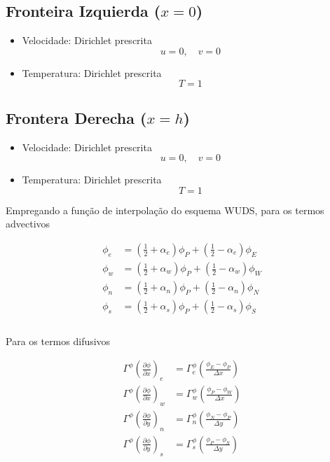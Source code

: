 \documentclass[]{article}
\begin{document}
\subsection*{Fronteira Izquierda (\(x = 0\))}
\begin{itemize}
	\item Velocidade: Dirichlet prescrita
	\[
	u = 0, \quad v = 0
	\]
	
	\item Temperatura: Dirichlet prescrita
	\[
	T = 1
	\]
	
\end{itemize}

\subsection*{Frontera Derecha (\(x = h\))}
\begin{itemize}
	\item Velocidade: Dirichlet prescrita 
	\[
	u = 0, \quad v = 0
	\]
	
	\item Temperatura: Dirichlet prescrita
	\[
	T = 1
	\]
	
\end{itemize}

Empregando a função de interpolação do esquema WUDS, para os termos advectivos

\begin{equation}
	\begin{aligned}
		\phi_e &= \left( \frac{1}{2} + \alpha_e \right) \phi_P + \left( \frac{1}{2} - \alpha_e \right) \phi_E \\
		\phi_w &= \left( \frac{1}{2} + \alpha_w \right) \phi_P + \left( \frac{1}{2} - \alpha_w \right) \phi_W \\
		\phi_n &= \left( \frac{1}{2} + \alpha_n \right) \phi_P + \left( \frac{1}{2} - \alpha_n \right) \phi_N \\
		\phi_s &= \left( \frac{1}{2} + \alpha_s \right) \phi_P + \left( \frac{1}{2} - \alpha_s \right) \phi_S \\
	\end{aligned}		
\end{equation}\\

Para os termos difusivos

\begin{equation}
	\begin{aligned}
		\Gamma^\phi \left( \frac{\partial \phi}{\partial x} \right)_e &=  \Gamma_e^\phi \left( \frac{\phi_E - \phi_P}{\Delta x} \right) \\
		\Gamma^\phi \left( \frac{\partial \phi}{\partial x} \right)_w &=  \Gamma_w^\phi \left( \frac{\phi_P - \phi_W}{\Delta x} \right) \\
		\Gamma^\phi \left( \frac{\partial \phi}{\partial y} \right)_n &=  \Gamma_n^\phi \left( \frac{\phi_N - \phi_P}{\Delta y} \right) \\
		\Gamma^\phi \left( \frac{\partial \phi}{\partial y} \right)_s &=  \Gamma_s^\phi \left( \frac{\phi_P - \phi_S}{\Delta y} \right)
	\end{aligned}		
\end{equation}\\
\end{document}
